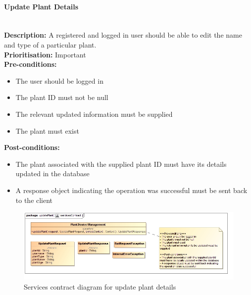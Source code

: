 \documentclass{article}
\begin{document}
\paragraph{Update Plant Details}\mbox{}\\
\textbf{Description:} A registered and logged in user should be able to edit the name and type of a particular plant.\\
\textbf{Prioritisation:} Important\\		
\textbf{Pre-conditions:}
\begin{itemize}
	\item The user should be logged in
	\item The plant ID must not be null
	\item The relevant updated information must be supplied
	\item The plant must exist
\end{itemize}
\textbf{Post-conditions:}
\begin{itemize}
	\item The plant associated with the supplied plant ID must have its details updated in the database
	\item A response object indicating the operation was successful must be sent back to the client
\end{itemize}

\begin{figure}[H]
	\includegraphics[width=\linewidth]{images/ServicesContracts/updatePlant.jpg}
	\caption{Services contract diagram for update plant details}
\end{figure}		
\end{document}
